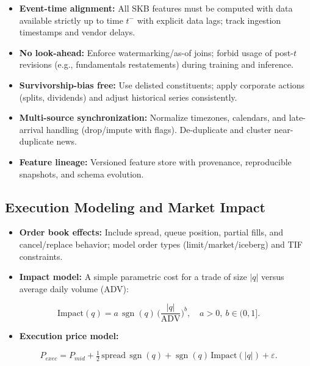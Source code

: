 \documentclass[11pt]{article}
\begin{document}
\begin{itemize}
\item   \textbf{Event-time alignment:} All SKB features must be computed with data available strictly up to time $t^{-}$ with explicit data lags; track ingestion timestamps and vendor delays.
\item   \textbf{No look-ahead:} Enforce watermarking/as-of joins; forbid usage of post-$t$ revisions (e.g., fundamentals restatements) during training and inference.
\item   \textbf{Survivorship-bias free:} Use delisted constituents; apply corporate actions (splits, dividends) and adjust historical series consistently.
\item   \textbf{Multi-source synchronization:} Normalize timezones, calendars, and late-arrival handling (drop/impute with flags). De-duplicate and cluster near-duplicate news.
\item   \textbf{Feature lineage:} Versioned feature store with provenance, reproducible snapshots, and schema evolution.

\end{itemize}
\subsection{Execution Modeling and Market Impact}

\begin{itemize}
\item   \textbf{Order book effects:} Include spread, queue position, partial fills, and cancel/replace behavior; model order types (limit/market/iceberg) and TIF constraints.
\item   \textbf{Impact model:} A simple parametric cost for a trade of size $|q|$ versus average daily volume (ADV):

\end{itemize}
\begin{equation}
\text{Impact}(q) = a\,\operatorname{sgn}(q)\,\Big(\frac{|q|}{\mathrm{ADV}}\Big)^b,\quad a>0,\ b\in(0,1].
\end{equation}

\begin{itemize}
\item   \textbf{Execution price model:}

\end{itemize}
\begin{equation}
P_{exec} = P_{mid} + \tfrac{1}{2}\,\text{spread}\,\operatorname{sgn}(q) + \operatorname{sgn}(q)\,\text{Impact}(|q|) + \varepsilon.
\end{equation}
\end{document}
